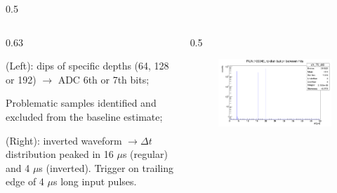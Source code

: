 \documentclass{beamer}
\begin{document}
\begin{frame}
\begin{columns}
\begin{column}{0.5\framewidth}
\begin{figure}[!h]
     \label{fig:normalhits}
\end{figure}
\end{column}
\end{columns}
\vspace{-1.5mm}
    \begin{columns}
    \begin{column}{0.63\framewidth}
        \setlength{\leftmargini}{1.1em}
      \begin{itemize}
 {\small
 \item (Left): dips of specific depths (64, 128 or 192) $\rightarrow$ ADC 6th or 7th bits;
\item Problematic samples identified and excluded from the baseline estimate;
\item (Right): inverted waveform $\rightarrow \Delta t $ distribution peaked in 16 $\mu$s (regular) and 4 $\mu$s (inverted). Trigger on trailing edge of 4 $\mu$s long input pulses.}

\end{itemize}
\end{column}
\begin{column}{0.5\framewidth}
         \begin{figure}[!h]
      \centering
      \hspace*{-2em}
      \includegraphics[width=\columnwidth]{figures/png/deltathits.png}
     \label{fig:normalhits}
\end{figure}
\end{column}
\end{columns}
\end{frame}
\end{document}
